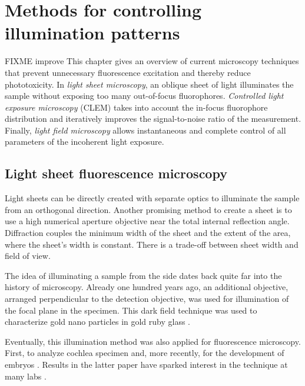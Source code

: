 
\chapter{Methods for controlling illumination patterns}
\label{sec:approaches}
%
\begin{summary}
  {\color{red} FIXME improve}
  This chapter gives an overview of current microscopy techniques that
  prevent unnecessary fluorescence excitation and thereby reduce
  phototoxicity. In \emph{light sheet microscopy}, an oblique sheet of
  light illuminates the sample without exposing too many out-of-focus
  fluorophores. \emph{Controlled light exposure microscopy} (CLEM)
  takes into account the in-focus fluorophore distribution and
  iteratively improves the signal-to-noise ratio of the measurement.
  Finally, \emph{light field microscopy} allows instantaneous and
  complete control of all parameters of the incoherent light exposure.
\end{summary}
\section{Light sheet fluorescence microscopy}
\label{sec:light-sheet-microscopy}
\begin{summary}
  Light sheets can be directly created with separate optics to
  illuminate the sample from an orthogonal direction. Another
  promising method to create a sheet is to use a high numerical
  aperture objective near the total internal reflection
  angle. Diffraction couples the minimum width of the sheet and the
  extent of the area, where the sheet's width is constant. There is a
  trade-off between sheet width and field of view.
\end{summary}
The idea of illuminating a sample from the side dates back quite far
into the history of microscopy. Already one hundred years ago, an
additional objective, arranged perpendicular to the detection
objective, was used for illumination of the focal plane in the
specimen. This dark field technique was used to characterize gold nano
particles in gold ruby glass \citep{Siedentopf1903}.

Eventually, this illumination method was also applied for fluorescence
microscopy. First, to analyze cochlea specimen \citep{Voie1993} and,
more recently, for the development of embryos
\citep{Huisken2004}. Results in the latter paper have sparked interest
in the technique at many labs \citep{Santi2011}.
